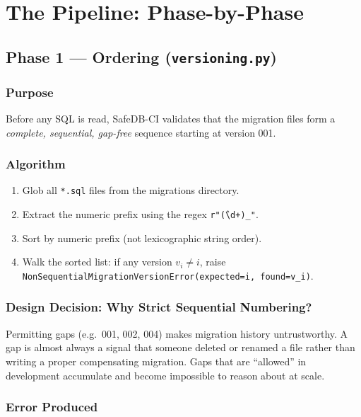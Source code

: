 \documentclass[12pt,a4paper]{report}
\begin{document}
\chapter{The Pipeline: Phase-by-Phase}

\section{Phase 1 — Ordering (\texttt{versioning.py})}

\subsection{Purpose}

Before any SQL is read, SafeDB-CI validates that the migration files form a
\emph{complete, sequential, gap-free} sequence starting at version 001.

\subsection{Algorithm}

\begin{enumerate}
  \item Glob all \texttt{*.sql} files from the migrations directory.
  \item Extract the numeric prefix using the regex \texttt{r"\^(\textbackslash d+)\_"}.
  \item Sort by numeric prefix (not lexicographic string order).
  \item Walk the sorted list: if any version \( v_i \neq i \), raise
        \texttt{NonSequentialMigrationVersionError(expected=i, found=v\_i)}.
\end{enumerate}

\subsection{Design Decision: Why Strict Sequential Numbering?}

Permitting gaps (e.g.\ 001, 002, 004) makes migration history untrustworthy.
A gap is almost always a signal that someone deleted or renamed a file rather
than writing a proper compensating migration. Gaps that are ``allowed'' in
development accumulate and become impossible to reason about at scale.

\subsection{Error Produced}
\end{document}
